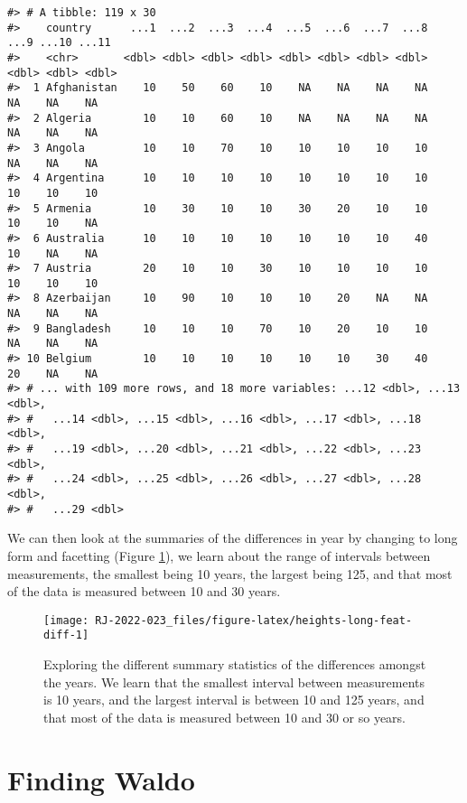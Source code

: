 \begin{verbatim}
#> # A tibble: 119 x 30
#>    country      ...1  ...2  ...3  ...4  ...5  ...6  ...7  ...8  ...9 ...10 ...11
#>    <chr>       <dbl> <dbl> <dbl> <dbl> <dbl> <dbl> <dbl> <dbl> <dbl> <dbl> <dbl>
#>  1 Afghanistan    10    50    60    10    NA    NA    NA    NA    NA    NA    NA
#>  2 Algeria        10    10    60    10    NA    NA    NA    NA    NA    NA    NA
#>  3 Angola         10    10    70    10    10    10    10    10    NA    NA    NA
#>  4 Argentina      10    10    10    10    10    10    10    10    10    10    10
#>  5 Armenia        10    30    10    10    30    20    10    10    10    10    NA
#>  6 Australia      10    10    10    10    10    10    10    40    10    NA    NA
#>  7 Austria        20    10    10    30    10    10    10    10    10    10    10
#>  8 Azerbaijan     10    90    10    10    10    20    NA    NA    NA    NA    NA
#>  9 Bangladesh     10    10    10    70    10    20    10    10    NA    NA    NA
#> 10 Belgium        10    10    10    10    10    10    30    40    20    NA    NA
#> # ... with 109 more rows, and 18 more variables: ...12 <dbl>, ...13 <dbl>,
#> #   ...14 <dbl>, ...15 <dbl>, ...16 <dbl>, ...17 <dbl>, ...18 <dbl>,
#> #   ...19 <dbl>, ...20 <dbl>, ...21 <dbl>, ...22 <dbl>, ...23 <dbl>,
#> #   ...24 <dbl>, ...25 <dbl>, ...26 <dbl>, ...27 <dbl>, ...28 <dbl>,
#> #   ...29 <dbl>
\end{verbatim}

We can then look at the summaries of the differences in year by changing to long form and facetting (Figure \ref{fig:heights-long-feat-diff}), we learn about the range of intervals between measurements, the smallest being 10 years, the largest being 125, and that most of the data is measured between 10 and 30 years.

\begin{figure}

{\centering \texttt{[image: RJ-2022-023\_files/figure-latex/heights-long-feat-diff-1]} 

}

\caption{Exploring the different summary statistics of the differences amongst the years. We learn that the smallest interval between measurements is 10 years, and the largest interval is between 10 and 125 years, and that most of the data is measured between 10 and 30 or so years.}\label{fig:heights-long-feat-diff}
\end{figure}

\hypertarget{finding-waldo}{%
\section{Finding Waldo}\label{finding-waldo}}

